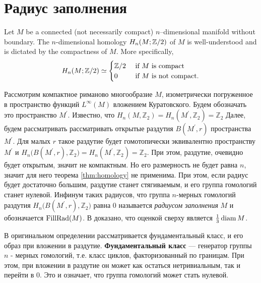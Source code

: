 \documentclass[11pt,twoside
]{article}
\begin{document}
\section{Радиус заполнения}
\begin{theorem}
  \label{thm:homology}
  Let $M$ be a connected (not necessarily compact) $n$--dimensional
  manifold without boundary.
  The $n$-dimensional homology $H_n(M;{\mathbb Z}/2)$ of $M$ is
  well-understood and is dictated by the compactness of $M$.
  More specifically,
  \begin{equation}\label{eq:fund-cls}
    H_n(M;{\mathbb Z}/2)\simeq
    \begin{cases}
      {\mathbb Z}/2&\text{ if }M\text{ is compact} \\
      0&\text{ if }M\text{ is not compact}.
    \end{cases}
  \end{equation}
\end{theorem}
Рассмотрим компактное риманово многообразие $M$, изометрически
погруженное в пространство функций $L^{\infty}(M)$ вложением
Куратовского. Будем обозначать это пространство $M ^{\prime}$.
Известно, что $H_{n}(M,\mathbb{Z}_{2})= H_{n}(M ^{\prime},
\mathbb{Z}_{2})= \mathbb{Z}_2$ Далее, будем рассматривать
рассматривать открытые раздутия $B(M ^{\prime}, r)$ пространства $M
^{\prime}$. Для малых $r$ такое раздутие будет гомотопически
эквивалентно пространству $M ^{\prime}$ и $H_{n}\big(B(M
^{\prime},r), \mathbb{Z}_{2}\big) = H_{n}(M ^{\prime},
\mathbb{Z}_{2})= \mathbb{Z}_2$. При этом, раздутие, очевидно будет
открытым, значит не компактным. Но его размерность не будет равна \(
n \), значит
для него теорема \ref{thm:homology} не применима. При этом, если
радиус будет достаточно большим, раздутие станет стягиваемым, и его
группа гомологий станет нулевой. Инфинум таких радиусов, что группа
\( n \)-мерных гомологий раздутия \( H_{n}\big(B(M
^{\prime},r), \mathbb{Z}_{2}\big) \) равна \( 0 \) называется
\emph{радиусом заполнения} \( M \) и обозначается \( \operatorname{FillRad}(M)\). В
\cite{katz1983filling} доказано,
что оценкой сверху является \( \frac 1 3 \operatorname{diam} M \).

В оригинальном определении рассматривается фундаментальный класс, и
его образ при вложении в раздутие. \textbf{Фундаментальный класс} ---
генератор группы \( n \) - мерных гомологий, т.е. класс циклов,
факторизованный по границам. При этом, при вложении в раздутие он
может как остаться нетривиальным, так и перейти в \( 0 \). Это и
означает, что группа гомологий может стать нулевой.
\end{document}
